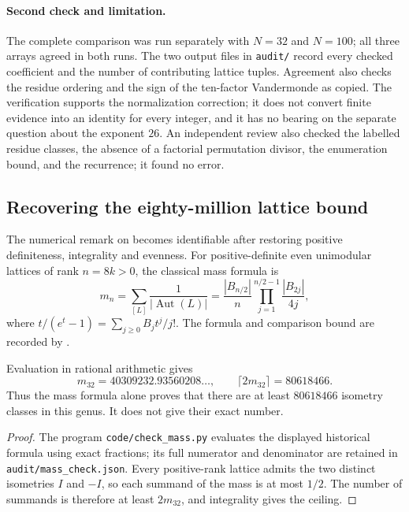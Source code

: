 \paragraph{Second check and limitation.}
The complete comparison was run separately with \(N=32\) and \(N=100\);
all three arrays agreed in both runs.  The two output files in
\texttt{audit/} record every checked coefficient and the number of contributing
lattice tuples.  Agreement also checks the residue ordering and the sign of
the ten-factor Vandermonde as copied.  The verification supports the
normalization correction; it does not convert finite evidence into an
identity for every integer, and it has no bearing on the separate question
about the exponent \(26\).
An independent review also checked the labelled residue classes, the absence
of a factorial permutation divisor, the enumeration bound, and the recurrence;
it found no error.

\subsection{Recovering the eighty-million lattice bound}
\label{verification:mass}

The numerical remark on  becomes identifiable after restoring
positive definiteness, integrality and evenness.  For positive-definite even
unimodular lattices of rank \(n=8k>0\), the classical mass formula is
\[
m_n=\sum_{[L]}\frac{1}{|\operatorname{Aut}(L)|}
=\frac{|B_{n/2}|}{n}\prod_{j=1}^{n/2-1}\frac{|B_{2j}|}{4j},
\]
where \(t/(e^t-1)=\sum_{j\geq0}B_jt^j/j!\).
The formula and comparison bound are recorded by
\citet[\S\S2, 6]{king2003mass}.

\begin{proposition}\oursComputed{}
Evaluation in rational arithmetic gives
\[
m_{32}=40309232.93560208\ldots,\qquad
\lceil 2m_{32}\rceil=80618466.
\]
Thus the mass formula alone proves that there are at least \(80618466\)
isometry classes in this genus.  It does not give their exact number.
\end{proposition}

\begin{proof}
The program \texttt{code/check\_mass.py} evaluates the displayed historical
formula using exact fractions; its full numerator and denominator are retained
in \texttt{audit/mass\_check.json}.  Every positive-rank lattice admits the two
distinct isometries \(I\) and \(-I\), so each summand of the mass is at most
\(1/2\).  The number of summands is therefore at least \(2m_{32}\), and
integrality gives the ceiling.
\end{proof}

